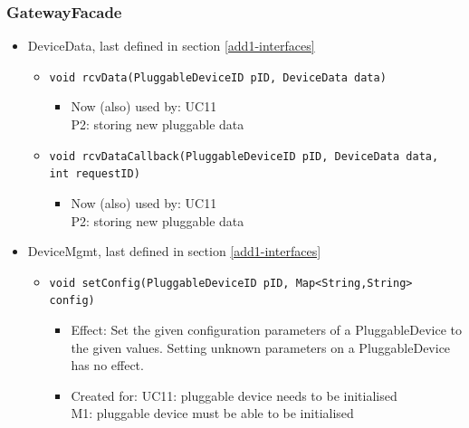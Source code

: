     \subsubsection{GatewayFacade}
        \begin{itemize}
            \item DeviceData, last defined in section \ref{add1-interfaces}
            \begin{itemize}
                \item \texttt{void rcvData(PluggableDeviceID pID, DeviceData data)}
                    \begin{itemize}
                        \item Now (also) used by: UC11 \\
                              P2: storing new pluggable data
                    \end{itemize}
                \item \texttt{void rcvDataCallback(PluggableDeviceID pID, DeviceData data, int requestID)}
                    \begin{itemize}
                        \item Now (also) used by: UC11 \\
                              P2: storing new pluggable data
                    \end{itemize}
            \end{itemize}

            \item DeviceMgmt, last defined in section \ref{add1-interfaces}
            \begin{itemize}
                \item \texttt{void setConfig(PluggableDeviceID pID, Map<String,String> config)}
                \begin{itemize}
                    \item Effect: Set the given configuration parameters of a
                          PluggableDevice to the given values. Setting unknown parameters
                          on a PluggableDevice has no effect.
                    \item Created for: UC11: pluggable device needs to be initialised \\
                          M1: pluggable device must be able to be initialised
                \end{itemize}
            \end{itemize}
        \end{itemize}

